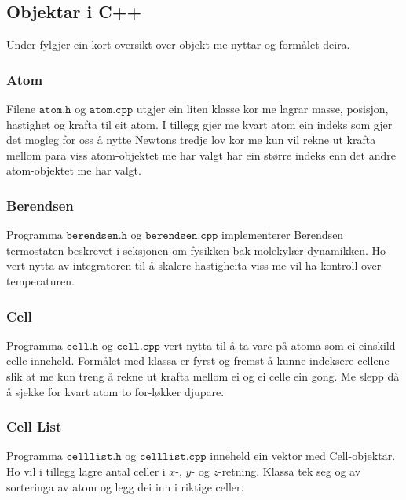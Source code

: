 \documentclass[12pt, a4paper]{article}
\theoremstyle{definition} \newtheorem*{definition}{Teorem}
\begin{document}
    \subsection*{Objektar i C++}
        Under fylgjer ein kort oversikt over objekt me nyttar og formålet deira.

        \subsubsection*{Atom}
            Filene $\texttt{atom.h}$ og $\texttt{atom.cpp}$ utgjer ein liten klasse kor me lagrar masse, posisjon, hastighet og krafta til eit atom. I tillegg 
            gjer me kvart atom ein indeks som gjer det mogleg for oss å nytte Newtons tredje lov kor me kun vil rekne ut krafta mellom para viss atom-objektet me
            har valgt har ein større indeks enn det andre atom-objektet me har valgt.

        \subsubsection*{Berendsen}
            Programma $\texttt{berendsen.h}$ og $\texttt{berendsen.cpp}$ implementerer Berendsen termostaten beskrevet i seksjonen om fysikken bak molekylær dynamikken.
            Ho vert nytta av integratoren til å skalere hastigheita viss me vil ha kontroll over temperaturen.

        \subsubsection*{Cell}
            Programma $\texttt{cell.h}$ og $\texttt{cell.cpp}$ vert nytta til å ta vare på atoma som ei einskild celle inneheld. Formålet med klassa er fyrst og fremst
            å kunne indeksere cellene slik at me kun treng å rekne ut krafta mellom ei og ei celle ein gong. Me slepp då å sjekke for kvart atom to for-løkker djupare.

        \subsubsection*{Cell List}
            Programma $\texttt{celllist.h}$ og $\texttt{celllist.cpp}$ inneheld ein vektor med Cell-objektar. Ho vil i tillegg lagre antal celler i $x$-, $y$- og $z$-retning.
            Klassa tek seg og av sorteringa av atom og legg dei inn i riktige celler.
\end{document}
